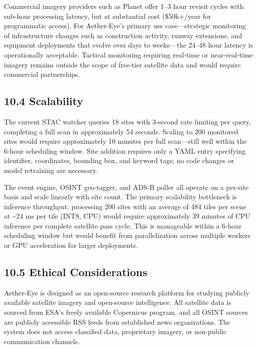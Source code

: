 \documentclass[11pt,a4paper]{article}
\begin{document}
Commercial imagery providers such as Planet offer 1--3 hour revisit cycles with sub-hour processing latency, but at substantial cost (\$50k+/year for programmatic access). For Aether-Eye's primary use case---strategic monitoring of infrastructure changes such as construction activity, runway extensions, and equipment deployments that evolve over days to weeks---the 24--48 hour latency is operationally acceptable. Tactical monitoring requiring real-time or near-real-time imagery remains outside the scope of free-tier satellite data and would require commercial partnerships.

\hypertarget{scalability}{%
\subsection{10.4 Scalability}\label{scalability}}

The current STAC watcher queries 18 sites with 3-second rate limiting per query, completing a full scan in approximately 54 seconds. Scaling to 200 monitored sites would require approximately 10 minutes per full scan---still well within the 6-hour scheduling window. Site addition requires only a YAML entry specifying identifier, coordinates, bounding box, and keyword tags; no code changes or model retraining are necessary.

The event engine, OSINT geo-tagger, and ADS-B poller all operate on a per-site basis and scale linearly with site count. The primary scalability bottleneck is inference throughput: processing 200 sites with an average of 484 tiles per scene at \textasciitilde24 ms per tile (INT8, CPU) would require approximately 39 minutes of CPU inference per complete satellite pass cycle. This is manageable within a 6-hour scheduling window but would benefit from parallelization across multiple workers or GPU acceleration for larger deployments.

\hypertarget{ethical-considerations}{%
\subsection{10.5 Ethical Considerations}\label{ethical-considerations}}

Aether-Eye is designed as an open-source research platform for studying publicly available satellite imagery and open-source intelligence. All satellite data is sourced from ESA's freely available Copernicus program, and all OSINT sources are publicly accessible RSS feeds from established news organizations. The system does not access classified data, proprietary imagery, or non-public communication channels.
\end{document}
